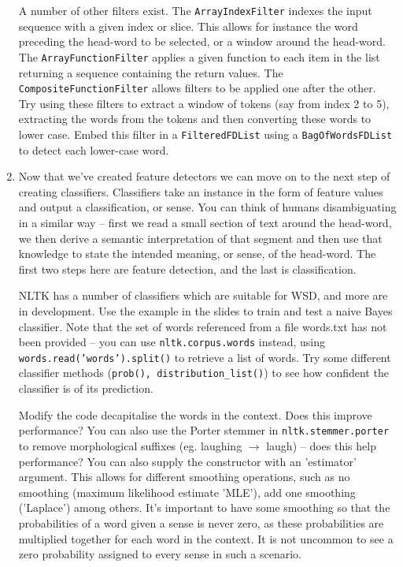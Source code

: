 \documentclass{worksheet}
\begin{document}
\begin{enumerate}
A number of other filters exist. The \texttt{ArrayIndexFilter} indexes the
input sequence with a given index or slice. This allows for instance the
word preceding the head-word to be selected, or a window around the
head-word. The \texttt{ArrayFunctionFilter} applies a given function to each
item in the list returning a sequence containing the return values. The
\texttt{CompositeFunctionFilter} allows filters to be applied one after the
other. Try using these filters to extract a window of tokens (say from index
2 to 5), extracting the words from the tokens and then converting these words
to lower case. Embed this filter in a \texttt{FilteredFDList} using a
\texttt{BagOfWordsFDList} to detect each lower-case word.

\item Now that we've created feature detectors we can move on to the next
step of creating classifiers. Classifiers take an instance in the form of
feature values and output a classification, or sense. You can think of
humans disambiguating in a similar way -- first we read a small section of
text around the head-word, we then derive a semantic interpretation of that
segment and then use that knowledge to state the intended meaning, or sense,
of the head-word. The first two steps here are feature detection, and the
last is classification.

NLTK has a number of classifiers which are suitable for WSD, and more are in
development. Use the example in the slides to train and test a naive Bayes
classifier.  Note that the set of words referenced from a file words.txt has
not been provided -- you can use \texttt{nltk.corpus.words} instead, using
\texttt{words.read('words').split()} to retrieve a list of words.  Try some
different classifier methods (\texttt{prob(), distribution\_list()}) to see
how confident the classifier is of its prediction.

Modify the code decapitalise the words in the context. Does this improve
performance?  You can also use the Porter stemmer in
\texttt{nltk.stemmer.porter} to remove morphological suffixes (eg. laughing
$\rightarrow$ laugh) -- does this help performance? You can also supply the
constructor with an 'estimator' argument. This allows for different smoothing
operations, such as no smoothing (maximum likelihood estimate 'MLE'), add one
smoothing ('Laplace') among others. It's important to have some smoothing so
that the probabilities of a word given a sense is never zero, as these
probabilities are multiplied together for each word in the context. It is not
uncommon to see a zero probability assigned to every sense in such a
scenario.


\end{enumerate}
\end{document}
